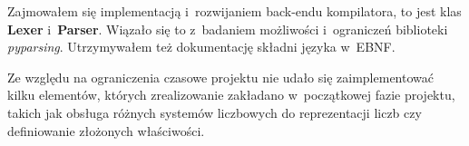 Zajmowałem się implementacją i~rozwijaniem back-endu kompilatora, to jest klas \textbf{Lexer} i~\textbf{Parser}. Wiązało się to z~badaniem możliwości i~ograniczeń biblioteki \emph{pyparsing}. Utrzymywałem też dokumentację składni języka w~EBNF.

Ze względu na ograniczenia czasowe projektu nie udało się zaimplementować kilku elementów, których zrealizowanie zakładano w~początkowej fazie projektu, takich jak obsługa różnych systemów liczbowych do reprezentacji liczb czy definiowanie złożonych właściwości.
